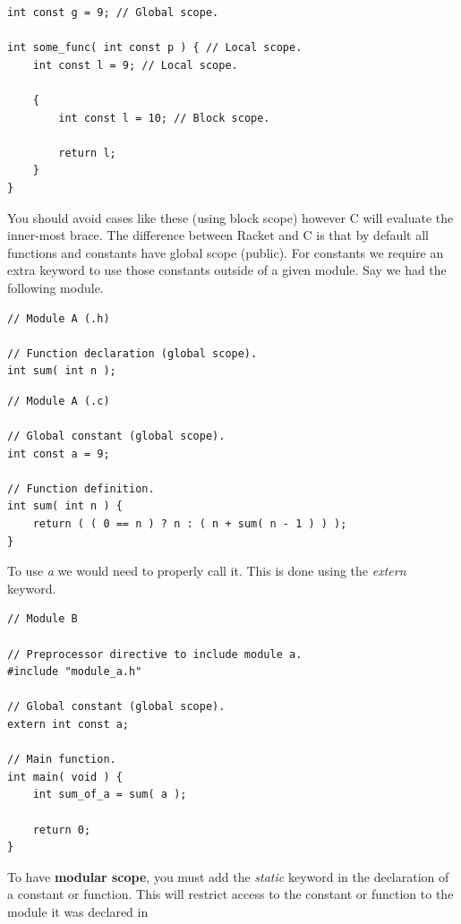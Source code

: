 \documentclass[12pt,extarticle]{article}
\begin{document}
\lstset {
	language=c
}
\begin{lstlisting}
int const g = 9; // Global scope.

int some_func( int const p ) { // Local scope.
	int const l = 9; // Local scope.
	
	{
		int const l = 10; // Block scope.
		
		return l;
	}
}
\end{lstlisting}

You should avoid cases like these (using block scope) however C will evaluate the inner-most brace. The difference between Racket and C is that by default all functions and constants have global scope (public). For constants we require an extra keyword to use those constants outside of a given module. Say we had the following module.\\

\lstset {
	language=c
}
\begin{lstlisting}
// Module A (.h)

// Function declaration (global scope).
int sum( int n );
\end{lstlisting}

\lstset {
	language=c
}
\begin{lstlisting}
// Module A (.c)

// Global constant (global scope).
int const a = 9;

// Function definition.
int sum( int n ) {
	return ( ( 0 == n ) ? n : ( n + sum( n - 1 ) ) );
}
\end{lstlisting}

To use \emph{a} we would need to properly call it. This is done using the \emph{extern} keyword.\\

\lstset {
	language=c
}
\begin{lstlisting}
// Module B

// Preprocessor directive to include module a.
#include "module_a.h"

// Global constant (global scope).
extern int const a;

// Main function.
int main( void ) {
	int sum_of_a = sum( a );	
	
	return 0;
}
\end{lstlisting}

To have \textbf{modular scope}, you must add the \emph{static} keyword in the declaration of a constant or function. This will restrict access to the constant or function to the module it was declared in\\
\end{document}
